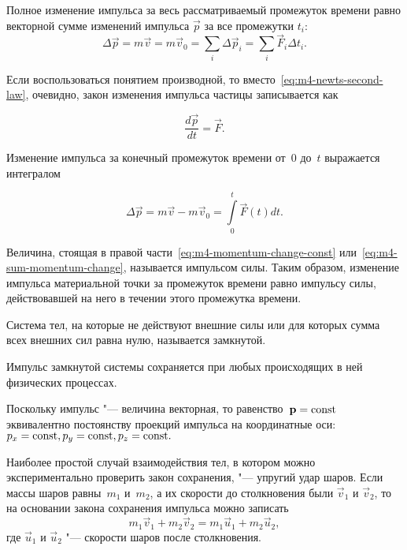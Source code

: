 \documentclass[a4paper, 12pt]{extarticle}
\newcommand{\issum}{\sum\limits_{i}}
\begin{document}
Полное изменение импульса за весь рассматриваемый промежуток времени равно векторной сумме изменений импульса $\vec p$ за все промежутки $t_i$:
\begin{equation}
\label{eq:m4-sum-momentum-change}
\Delta \vec p = m \vec v = m \vec v_0 = \issum \Delta \vec p_i = \issum \vec F_i \Delta t_i.
\end{equation}

Если воспользоваться понятием производной, то вместо~\eqref{eq:m4-newts-second-law}, очевидно, закон изменения импульса частицы записывается как

\begin{equation}
\label{eq:m4-momentum-change-via-drvt}
\frac{d \vec p}{d t} = \vec F .
\end{equation}

Изменение импульса за конечный промежуток времени от~0 до~$t$ выражается интегралом

\begin{equation}
\label{eq:m4-total-momentum-change-via-int}
\Delta \vec p = m \vec v - m \vec v_0 = \int\limits_0^t \vec F\left(t\right) d t.
\end{equation}

Величина, стоящая в правой части~\eqref{eq:m4-momentum-change-const} или~\eqref{eq:m4-sum-momentum-change}, называется импульсом силы. Таким образом, изменение импульса материальной точки за промежуток времени равно импульсу силы, действовавшей на него в течении этого промежутка времени.

Система тел, на которые не действуют внешние силы или для которых сумма всех внешних сил равна нулю, называется замкнутой.

Импульс замкнутой системы сохраняется при любых происходящих в ней физических процессах.

Поскольку импульс "--- величина векторная, то равенство~$\mathbf{p} = \textrm{const}$ эквивалентно постоянству проекций импульса на координатные оси: $p_x = \textrm{const}, p_y = \textrm{const}, p_z = \textrm{const}.$  %

Наиболее простой случай взаимодействия тел, в котором можно экспериментально проверить закон сохранения, "--- упругий удар шаров. Если массы шаров равны~$m_1$ и~$m_2$, а их скорости до столкновения были $\vec v_1$ и $\vec v_2$, то на основании закона сохранения импульса можно записать
\begin{equation}
\label{eq:m4-balls-collision}
m_1 \vec v_1 + m_2 \vec v_2 = m_1 \vec u_1 + m_2 \vec u_2,
\end{equation}
где $\vec u_1$ и $\vec u_2$ "--- скорости шаров после столкновения.
\end{document}
